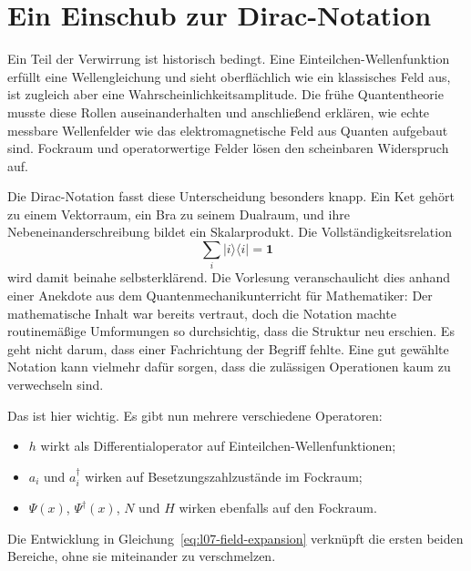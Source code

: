 \section{Ein Einschub zur Dirac-Notation}

Ein Teil der Verwirrung ist historisch bedingt. Eine Einteilchen-Wellenfunktion erfüllt eine Wellengleichung und sieht oberflächlich wie ein klassisches Feld aus, ist zugleich aber eine Wahrscheinlichkeitsamplitude. Die frühe Quantentheorie musste diese Rollen auseinanderhalten und anschließend erklären, wie echte messbare Wellenfelder wie das elektromagnetische Feld aus Quanten aufgebaut sind. Fockraum und operatorwertige Felder lösen den scheinbaren Widerspruch auf.

Die Dirac-Notation fasst diese Unterscheidung besonders knapp. Ein Ket gehört zu einem Vektorraum, ein Bra zu seinem Dualraum, und ihre Nebeneinanderschreibung bildet ein Skalarprodukt. Die Vollständigkeitsrelation
\begin{equation}
\sum_i|i\rangle\langle i|=\mathbf 1
\end{equation}
wird damit beinahe selbsterklärend. Die Vorlesung veranschaulicht dies anhand einer Anekdote aus dem Quantenmechanikunterricht für Mathematiker: Der mathematische Inhalt war bereits vertraut, doch die Notation machte routinemäßige Umformungen so durchsichtig, dass die Struktur neu erschien. Es geht nicht darum, dass einer Fachrichtung der Begriff fehlte. Eine gut gewählte Notation kann vielmehr dafür sorgen, dass die zulässigen Operationen kaum zu verwechseln sind.

Das ist hier wichtig. Es gibt nun mehrere verschiedene Operatoren:
\begin{itemize}
\item \(h\) wirkt als Differentialoperator auf Einteilchen-Wellenfunktionen;
\item \(a_i\) und \(a_i^\dagger\) wirken auf Besetzungszahlzustände im Fockraum;
\item \(\Psi(x)\), \(\Psi^\dagger(x)\), \(N\) und \(H\) wirken ebenfalls auf den Fockraum.
\end{itemize}
Die Entwicklung in Gleichung~\eqref{eq:l07-field-expansion} verknüpft die ersten beiden Bereiche, ohne sie miteinander zu verschmelzen.

\begin{classroomqa}
\end{classroomqa}


